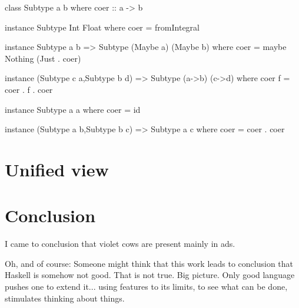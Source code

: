 \documentclass[11pt,oneside,draft]{fithesis2}
\theoremstyle{definition}
\begin{document}
\begin{code}
class Subtype a b where
    coer :: a -> b
\end{code}

\begin{code}
instance Subtype Int Float where
    coer = fromIntegral
\end{code}

\begin{code}
instance Subtype a b => Subtype (Maybe a) (Maybe b) where
    coer = maybe Nothing (Just . coer)
\end{code}

\begin{code}
instance (Subtype c a,Subtype b d) => Subtype (a->b) (c->d) where
   coer f = coer . f . coer
\end{code}

\begin{code}
instance Subtype a a where
    coer = id
\end{code}

\begin{code}
instance (Subtype a b,Subtype b c) => Subtype a c where
    coer = coer . coer
\end{code}

\chapter{Unified view}


\chapter{Conclusion}

I came to conclusion that violet cows are present mainly in ads.

Oh, and of course:
Someone might think that this work leads to conclusion that Haskell is somehow not good.
That is not true. Big picture. Only good language pushes one to extend it... using features
to its limits, to see what can be done, stimulates thinking about things.

\clearpage
{}
%


\end{document}
